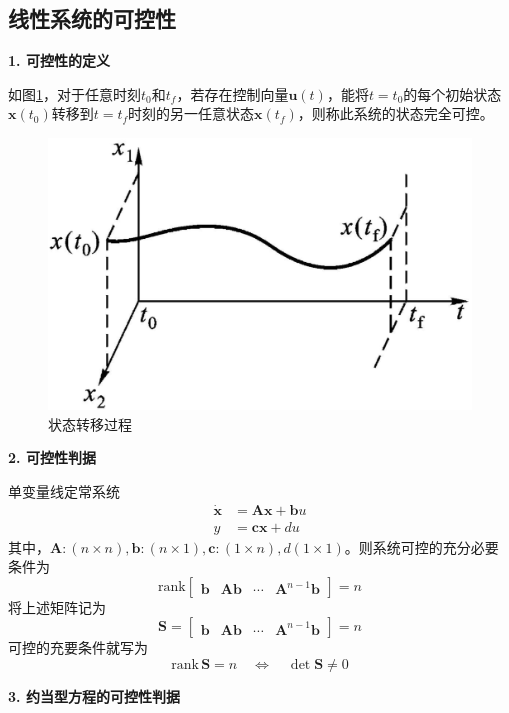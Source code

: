 \subsection{线性系统的可控性}
\noindent \textbf{1. 可控性的定义}

如图\ref{状态转移}，对于任意时刻$t_0$和$t_f$，若存在控制向量$\bm{u}(t)$，能将$t = t_0$的每个初始状态$\bm{x}(t_0)$转移到$t = t_f$时刻的另一任意状态$\bm{x}(t_f)$，则称此系统的状态完全可控。

\begin{figure}[!htb]
	\centering
	\includegraphics[width=0.3\linewidth]{pic/状态转移.jpg}
	\caption{状态转移过程}
	\label{状态转移}
\end{figure}

\noindent \textbf{2. 可控性判据}

单变量线定常系统
\begin{align}
	\dot{\bm{x}} &= \bm{Ax} + \bm{b}u\\
	y &= \bm{cx} + du 
\end{align}
其中，$\bm{A}:(n\times n),\bm{b}:(n\times 1), \bm{c}:(1\times n), d(1\times 1)$。则系统可控的充分必要条件为
\begin{equation}
	\text{rank}
	\begin{bmatrix}
		\bm{b} & \bm{Ab} & \cdots & \bm{A}^{n-1}\bm{b}
	\end{bmatrix} = n
\end{equation}
将上述矩阵记为
\begin{equation}
	\bm{S} = 
	\begin{bmatrix}
		\bm{b} & \bm{Ab} & \cdots & \bm{A}^{n-1}\bm{b}
	\end{bmatrix} = n
\end{equation}
可控的充要条件就写为
\begin{equation}
	\text{rank}\,\bm{S} = n \quad \Longleftrightarrow \quad \det \bm{S} \neq 0
\end{equation}
\vspace*{0.5em}

\noindent \textbf{3. 约当型方程的可控性判据}

